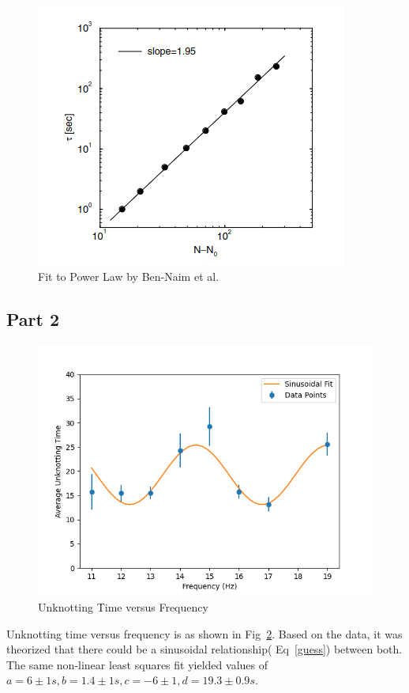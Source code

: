\documentclass[12pt]{IEEEtran}
\begin{document}
\begin{figure}[h]
    \centering
    \includegraphics[scale=0.5]{theoretical.png}
    \caption{Fit to Power Law by Ben-Naim et al.~\cite{bennaim}}\label{theoretical}
\end{figure}

\subsection{Part 2}

\begin{figure}[h]
    \includegraphics[scale=0.5]{part2_plot.png}
    \caption{Unknotting Time versus Frequency}\label{part2data}
\end{figure}

Unknotting time versus frequency is as shown in Fig~\ref{part2data}. Based on the data, it was theorized that there could be a sinusoidal relationship( Eq~\ref{guess}) between both. The same non-linear least squares fit yielded values of $a = 6 \pm 1\unit{s}, b = 1.4 \pm 1\unit{s}, c = -6 \pm 1, d = 19.3 \pm 0.9\unit{s}$.
\end{document}

